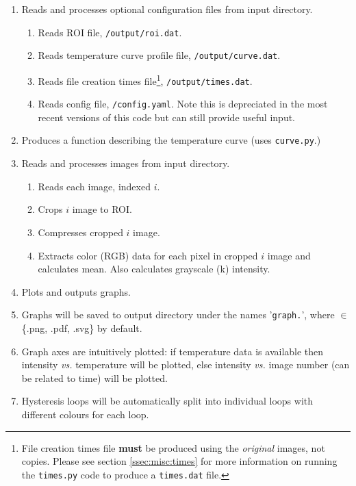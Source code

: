 \begin{enumerate}
{		
		}
	\item	Reads and processes optional configuration files from input directory.
	\begin{enumerate}
		\item 	Reads ROI file, \texttt{/output/roi.dat}.
		\item	Reads temperature curve profile file, \texttt{/output/curve.dat}.
		\item	Reads file creation times file\footnote{File creation times file \textbf{must} be produced using the \textit{original} images, not copies. Please see section \ref{ssec:misc:times} for more information on running the \texttt{times.py} code to produce a \texttt{times.dat} file.}, \texttt{/output/times.dat}.
		\item	Reads config file, \texttt{/config.yaml}. Note this is depreciated in the most recent versions of this code but can still provide useful input.
	\end{enumerate}
	\item	Produces a function describing the temperature curve (uses \texttt{curve.py}.)
	\item	Reads and processes images from input directory.
	\begin{enumerate}
		\item 	Reads each image, indexed $ i $.
		\item	Crops $ i $ image to ROI.
		\item	Compresses cropped $ i $ image.
		\item	Extracts color (RGB) data for each pixel in cropped $ i $ image and calculates mean. Also calculates grayscale (k) intensity.
	\end{enumerate}
	\item	Plots and outputs graphs.
	\item[]	Graphs will be saved to output directory under the names '\texttt{graph.}', where  $ \in $ \{.png, .pdf, .svg\} by default.
	\item[]	Graph axes are intuitively plotted: if temperature data is available then intensity \textit{vs.} temperature will be plotted, else intensity \textit{vs.} image number (can be related to time) will be plotted.
	\item[]	Hysteresis loops will be automatically split into individual loops with different colours for each loop.
\end{enumerate}

